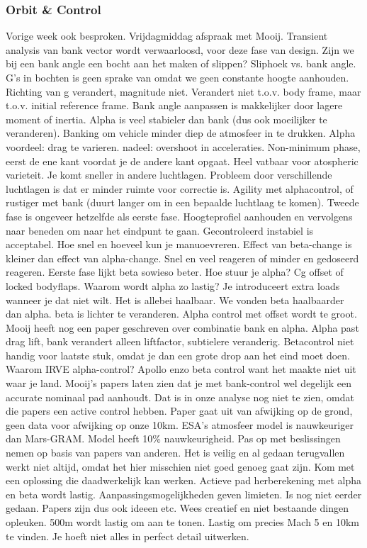 \subsubsection{Orbit \& Control}
Vorige week ook besproken. Vrijdagmiddag afspraak met Mooij. Transient analysis van bank vector wordt verwaarloosd, voor deze fase van design. Zijn we bij een bank angle een bocht aan het maken of slippen? Sliphoek vs. bank angle. G's in bochten is geen sprake van omdat we geen constante hoogte aanhouden. Richting van g verandert, magnitude niet. Verandert niet t.o.v. body frame, maar t.o.v. initial reference frame. Bank angle aanpassen is makkelijker door lagere moment of inertia. Alpha is veel stabieler dan bank (dus ook moeilijker te veranderen). Banking om vehicle minder diep de atmosfeer in te drukken. Alpha voordeel: drag te varieren. nadeel: overshoot in acceleraties. Non-minimum phase, eerst de ene kant voordat je de andere kant opgaat. Heel vatbaar voor atospheric varieteit. Je komt sneller in andere luchtlagen. Probleem door verschillende luchtlagen is dat er minder ruimte voor correctie is. Agility met alphacontrol, of rustiger met bank (duurt langer om in een bepaalde luchtlaag te komen). Tweede fase is ongeveer hetzelfde als eerste fase. Hoogteprofiel aanhouden en vervolgens naar beneden om naar het eindpunt te gaan. Gecontroleerd instabiel is acceptabel. Hoe snel en hoeveel kun je manuoevreren. Effect van beta-change is kleiner dan effect van alpha-change. Snel en veel reageren of minder en gedoseerd reageren. Eerste fase lijkt beta sowieso beter. Hoe stuur je alpha? Cg offset of locked bodyflaps. Waarom wordt alpha zo lastig? Je introduceert extra loads wanneer je dat niet wilt. Het is allebei haalbaar. We vonden beta haalbaarder dan alpha. beta is lichter te veranderen. Alpha control met offset wordt te groot. Mooij heeft nog een paper geschreven over combinatie bank en alpha. Alpha past drag lift, bank verandert alleen liftfactor, subtielere veranderig. Betacontrol niet handig voor laatste stuk, omdat je dan een grote drop aan het eind moet doen. Waarom IRVE alpha-control? Apollo enzo beta control want het maakte niet uit waar je land. Mooij's papers laten zien dat je met bank-control wel degelijk een accurate nominaal pad aanhoudt. Dat is in onze analyse nog niet te zien, omdat die papers een active control hebben. Paper gaat uit van afwijking op de grond, geen data voor afwijking op onze 10km. ESA's atmosfeer model is nauwkeuriger dan Mars-GRAM. Model heeft 10\% nauwkeurigheid. Pas op met beslissingen nemen op basis van papers van anderen. Het is veilig en al gedaan terugvallen werkt niet altijd, omdat het hier misschien niet goed genoeg gaat zijn. Kom met een oplossing die daadwerkelijk kan werken. Actieve pad herberekening met alpha en beta wordt lastig. Aanpassingsmogelijkheden geven limieten. Is nog niet eerder gedaan. Papers zijn dus ook ideeen etc. Wees creatief en niet bestaande dingen opleuken. 500m wordt lastig om aan te tonen. Lastig om precies Mach 5 en 10km te vinden. Je hoeft niet alles in perfect detail uitwerken.

